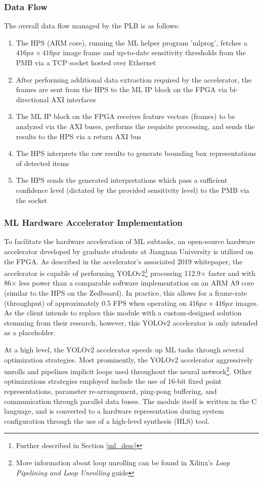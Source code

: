 \subsubsection{Data Flow}
The overall data flow managed by the PLB is as follows:
\begin{enumerate}
\item The HPS (ARM core), running the ML helper program 'mlprog', fetches a $416px \times 416px$ image frame and up-to-date sensitivity thresholds from the PMB via a TCP socket hosted over Ethernet
\item After performing additional data extraction required by the accelerator, the frames are sent from the HPS to the ML IP block on the FPGA via bi-directional AXI interfaces
\item The ML IP block on the FPGA receives feature vectors (frames) to be analyzed via the AXI buses, performs the requisite processing, and sends the results to the HPS via a return AXI bus
\item The HPS interprets the raw results to generate bounding box representations of detected items
\item The HPS sends the generated interpretations which pass a sufficient confidence level (dictated by the provided sensitivity level) to the PMB via the socket
\end{enumerate}

\subsubsection{ML Hardware Accelerator Implementation}\label{ml_accel}
To facilitate the hardware acceleration of ML subtasks, an open-source hardware accelerator \cite{yolov2accel} developed by graduate students at Jiangnan University is utilized on the FPGA. As described in the accelerator's associated 2019 whitepaper\cite{yolov2unipaper}, the accelerator is capable of performing YOLOv2\footnote{Further described in Section \ref{ml_desc}} processing 112.9$\times$ faster and with 86$\times$ less power than a comparable software implementation on an ARM A9 core (similar to the HPS on the Zedboard). In practice, this allows for a frame-rate (throughput) of approximately 0.5 FPS when operating on $416px \times 416px$ images. As the client intends to replace this module with a custom-designed solution stemming from their research, however, this YOLOv2 accelerator is only intended as a placeholder.

At a high level, the YOLOv2 accelerator speeds up ML tasks through several optimization strategies. Most prominently, the YOLOv2 accelerator aggressively unrolls and pipelines implicit loops used throughout the neural network\footnote{More information about loop unrolling can be found in Xilinx's \textit{Loop Pipelining and Loop Unrolling} guide\cite{xilinx}}. Other optimizations strategies employed include the use of 16-bit fixed point representations, parameter re-arrangement, ping-pong buffering\cite{pingpong}, and communication through parallel data buses. The module itself is written in the C language, and is converted to a hardware representation during system configuration through the use of a high-level synthesis (HLS) tool. 


